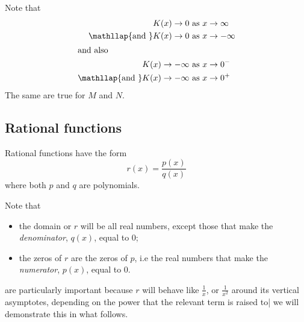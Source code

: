 \begin{doyouunderstand}
\begin{problem}
\begin{subproblem}
\begin{shortsolution}

				 Note that
				 \begin{align*}
					 K(x)\rightarrow 0                                & \text{ as } x\rightarrow\infty  \\
					 \mathllap{\text{and }}    K(x)\rightarrow 0      & \text{ as } x\rightarrow-\infty \\
					 \intertext{and also}
					 K(x)\rightarrow -\infty                          & \text{ as } x\rightarrow 0^-    \\
					 \mathllap{\text{and }}   K(x)\rightarrow -\infty & \text{ as } x\rightarrow 0^+
				 \end{align*}
				 The same are true for $M$ and $N$.
			 \end{shortsolution}
		 \end{subproblem}
		 \end{problem}
	 \end{doyouunderstand}

 \subsection*{Rational functions}
	 \begin{pccdefinition}\label{rat:def:function}
		 Rational functions have the form
		 \[
			 r(x) = \frac{p(x)}{q(x)}
		 \]
		 where both $p$ and $q$ are polynomials.

		 Note that
		 \begin{itemize}
			 \item the domain or $r$ will be all real numbers, except those that
			       make the \emph{denominator}, $q(x)$, equal to $0$;
			 \item the zeros of $r$ are the zeros of $p$, i.e the real numbers
			       that make the \emph{numerator}, $p(x)$, equal to $0$.
		 \end{itemize}

		  are particularly important because $r$
		 will behave like $\frac{1}{x}$, or $\frac{1}{x^2}$ around its vertical asymptotes,
		 depending on the power that the relevant term is raised to| we will demonstrate
		 this in what follows.
	 \end{pccdefinition}

